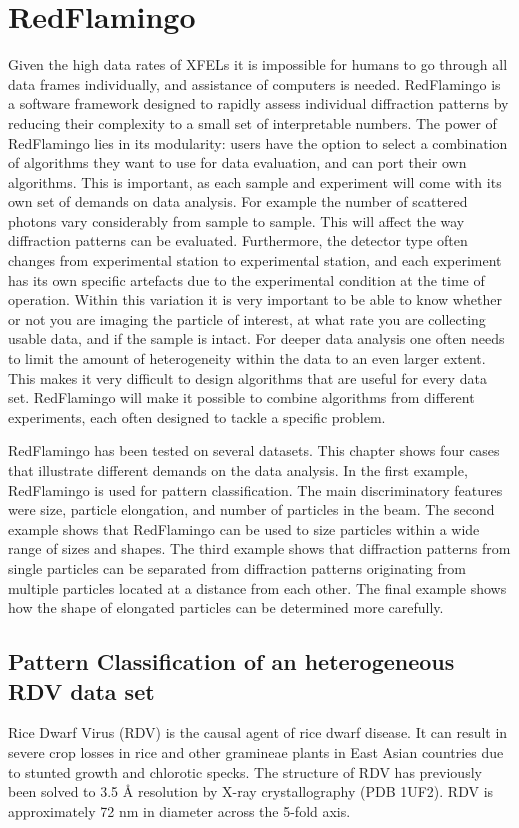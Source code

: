 \section{RedFlamingo}

Given the high data rates of XFELs it is impossible for humans to go through all data frames individually, and assistance of computers is needed.
RedFlamingo is a software framework designed to rapidly assess individual diffraction patterns by reducing their complexity to a small set of interpretable numbers. The power of RedFlamingo lies in its modularity: users have the option to select a combination of algorithms they want to use for data evaluation, and can port their own algorithms. This is important, as each sample and experiment will come with its own set of demands on data analysis. For example the number of scattered photons vary considerably from sample to sample. This will affect the way diffraction patterns can be evaluated. Furthermore, the detector type often changes from experimental station to experimental station, and each experiment has its own specific artefacts due to the experimental condition at the time of operation. Within this variation it is very important to be able to know whether or not you are imaging the particle of interest, at what rate you are collecting usable data, and if the sample is intact. For deeper data analysis one often needs to limit the amount of heterogeneity within the data to an even larger extent. This makes it very difficult to design algorithms that are useful for every data set. RedFlamingo will make it possible to combine algorithms from different experiments, each often designed to tackle a specific problem. 

RedFlamingo has been tested on several datasets. This chapter shows four cases that illustrate different demands on the data analysis. In the first example, RedFlamingo is used for pattern classification. The main discriminatory features were size, particle elongation, and number of particles in the beam. The second example shows that RedFlamingo can be used to size particles within a wide range of sizes and shapes. The third example shows that diffraction patterns from single particles can be separated from diffraction patterns originating from multiple particles located at a distance from each other. The final example shows how the shape of elongated particles can be determined more carefully. 

\subsection{Pattern Classification of an heterogeneous RDV data set}
Rice Dwarf Virus (RDV) is the causal agent of rice dwarf disease. It can result in severe crop losses in rice and other gramineae plants in East Asian countries due to stunted growth and chlorotic specks. The structure of RDV has previously been solved to 3.5 {\AA} resolution by X-ray crystallography \cite{Nakagawa2003} (PDB 1UF2). RDV is approximately 72 nm in diameter across the 5-fold axis.

